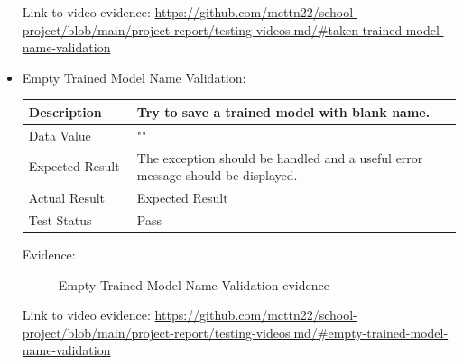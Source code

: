 \documentclass[./project-report/src/latex/project-report.tex]{subfiles}
\begin{document}
\begin{itemize}
		Link to video evidence: \url{https://github.com/mcttn22/school-project/blob/main/project-report/testing-videos.md/#taken-trained-model-name-validation}

	\pagebreak
	
	\item Empty Trained Model Name Validation: \newline\newline
		\begin{tabular}{|p{0.25\linewidth}|p{0.75\linewidth}|}
			\hline
			Description & Try to save a trained model with blank name. \\
			\hline
			Data Value & "" \\
			\hline
			Expected Result & The exception should be handled and a useful error message should be displayed. \\
			\hline
			Actual Result & Expected Result \\
			\hline
			Test Status & Pass \\
			\hline
		\end{tabular}

		\vspace{5mm}

		Evidence:
		\begin{figure}[h!]
		\centering
		\caption{Empty Trained Model Name Validation evidence}
		\end{figure}

		Link to video evidence: \url{https://github.com/mcttn22/school-project/blob/main/project-report/testing-videos.md/#empty-trained-model-name-validation}


\end{itemize}
\end{document}
